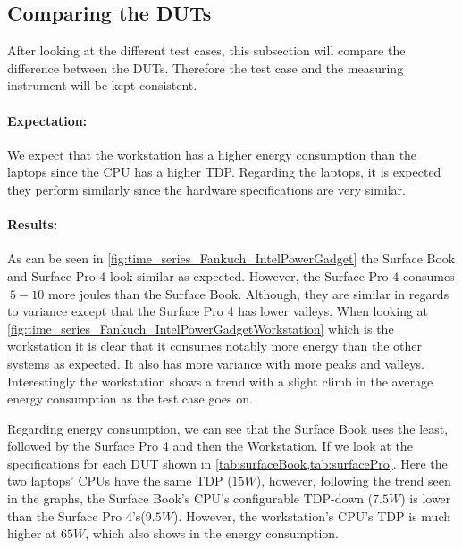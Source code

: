 


\subsection{Comparing the DUTs}
After looking at the different test cases, this subsection will compare the difference between the DUTs. Therefore the test case and the measuring instrument will be kept consistent. 

\paragraph{Expectation:}
We expect that the workstation has a higher energy consumption than the laptops since the CPU has a higher TDP. Regarding the laptops, it is expected they perform similarly since the hardware specifications are very similar.

\paragraph{Results:}
As can be seen in \cref{fig:time_series_Fankuch_IntelPowerGadget} the Surface Book and Surface Pro 4 look similar as expected. However, the Surface Pro 4 consumes $~5-10$ more joules than the Surface Book. Although, they are similar in regards to variance except that the Surface Pro 4 has lower valleys. When looking at \cref{fig:time_series_Fankuch_IntelPowerGadgetWorkstation} which is the workstation it is clear that it consumes notably more energy than the other systems as expected. It also has more variance with more peaks and valleys. Interestingly the workstation shows a trend with a slight climb in the average energy consumption as the test case goes on.



Regarding energy consumption, we can see that the Surface Book uses the least, followed by the Surface Pro 4 and then the Workstation. If we look at the specifications for each DUT shown in \cref{tab:surfaceBook,tab:surfacePro}. Here the two laptops' CPUs have the same TDP ($15W$), however, following the trend seen in the graphs, the Surface Book's CPU's configurable TDP-down ($7.5W$) is lower than the Surface Pro 4's($9.5W$). However, the workstation's CPU's TDP is much higher at $65W$, which also shows in the energy consumption. %

